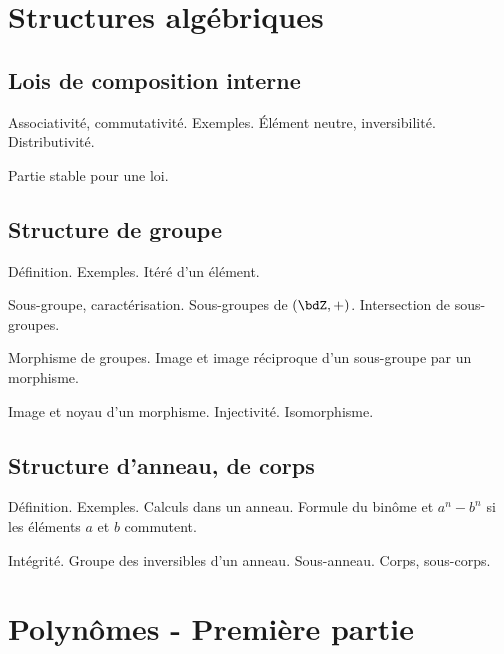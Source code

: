 \documentclass[a4paper,french,bookmarks]{article}
\begin{document}

\section*{Structures algébriques}

\subsection{Lois de composition interne}

\begin{enumerate}
    \ithand Associativité, commutativité. Exemples. Élément neutre, inversibilité. Distributivité.
    
    \ithand Partie stable pour une loi.
\end{enumerate}

\subsection{Structure de groupe}

\begin{enumerate}
    \ithand Définition. Exemples. Itéré d’un élément.

    \ithand Sous-groupe, caractérisation. Sous-groupes de $(\bdZ,+)$. Intersection de sous-groupes.

    \ithand Morphisme de groupes. Image et image réciproque d’un sous-groupe par un morphisme.

    \ithand Image et noyau d’un morphisme. Injectivité. Isomorphisme.
\end{enumerate}

\subsection{Structure d’anneau, de corps}

\begin{enumerate}
    \ithand Définition. Exemples. Calculs dans un anneau. Formule du binôme et $a^n - b^n$ si les éléments $a$ et $b$ commutent.
    
    \ithand Intégrité. Groupe des inversibles d’un anneau. Sous-anneau. Corps, sous-corps.
\end{enumerate}

\section*{Polynômes - Première partie}
\end{document}
